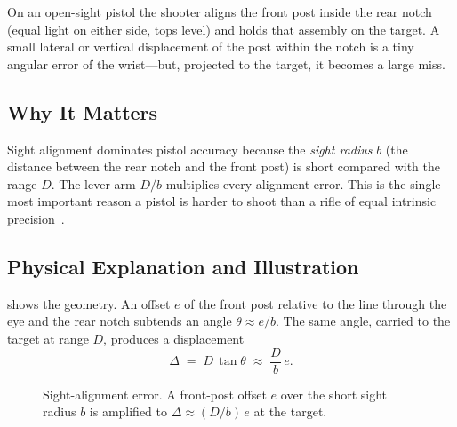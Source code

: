 \documentclass[11pt]{article}
\begin{document}
On an open-sight pistol the shooter aligns the front post inside the rear
notch (equal light on either side, tops level) and holds that assembly on
the target.  A small lateral or vertical displacement of the post within
the notch is a tiny angular error of the wrist---but, projected to the
target, it becomes a large miss.

\subsection{Why It Matters}

Sight alignment dominates pistol accuracy because the \emph{sight radius}
$b$ (the distance between the rear notch and the front post) is short
compared with the range $D$.  The lever arm $D/b$ multiplies every
alignment error.  This is the single most important reason a pistol is
harder to shoot than a rifle of equal intrinsic precision~\cite{nra}.

\subsection{Physical Explanation and Illustration}

 shows the geometry.  An offset $e$ of the front post
relative to the line through the eye and the rear notch subtends an angle
$\theta \approx e/b$.  The same angle, carried to the target at range
$D$, produces a displacement
\[
  \Delta \;=\; D\,\tan\theta \;\approx\; \frac{D}{b}\,e .
\]

\begin{figure}[H]
\centering
{}
\caption{Sight-alignment error. A front-post offset $e$ over the short
sight radius $b$ is amplified to $\Delta \approx (D/b)\,e$ at the target.}
\label{fig:align}
\end{figure}
\end{document}
